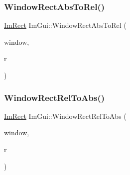 \mbox{\label{namespaceImGui_a06d8e9fae450c785dc8f61f6e03462a7}} 
\subsubsection{\texorpdfstring{Window\+Rect\+Abs\+To\+Rel()}{WindowRectAbsToRel()}}
{\footnotesize\ttfamily \hyperlink{structImRect}{Im\+Rect} Im\+Gui\+::\+Window\+Rect\+Abs\+To\+Rel (\begin{DoxyParamCaption}\item[{\hyperlink{structImGuiWindow}{Im\+Gui\+Window} $\ast$}]{window,  }\item[{const \hyperlink{structImRect}{Im\+Rect} \&}]{r }\end{DoxyParamCaption})\hspace{0.3cm}{\ttfamily [inline]}}

\mbox{\label{namespaceImGui_a10d8f47027c5bea2da6d5792ada70a7f}} 
\subsubsection{\texorpdfstring{Window\+Rect\+Rel\+To\+Abs()}{WindowRectRelToAbs()}}
{\footnotesize\ttfamily \hyperlink{structImRect}{Im\+Rect} Im\+Gui\+::\+Window\+Rect\+Rel\+To\+Abs (\begin{DoxyParamCaption}\item[{\hyperlink{structImGuiWindow}{Im\+Gui\+Window} $\ast$}]{window,  }\item[{const \hyperlink{structImRect}{Im\+Rect} \&}]{r }\end{DoxyParamCaption})\hspace{0.3cm}{\ttfamily [inline]}}


